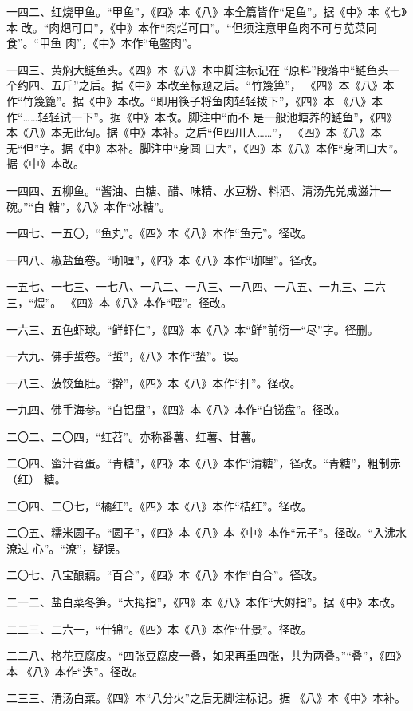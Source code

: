 \begin{list}{}
一四二、红烧甲鱼。“甲鱼”，《四》本《八》本全篇皆作“足鱼”。据《中》本《七》本
改。“肉𤆵可口”，《中》本作“肉烂可口”。“但须注意甲鱼肉不可与苋菜同食”。“甲鱼
肉”，《中》本作“龟鳖肉”。

一四三、黄焖大鲢鱼头。《四》本《八》本中脚注标记{\footnotesize{}}在
“原料”段落中“鲢鱼头一个约四、五斤”之后。据《中》本改至标题之后。“竹篾箅”，
《四》本《八》本作“竹篾篦”。据《中》本改。“即用筷子将鱼肉轻轻拨下”，《四》本
《八》本作“……轻轻试一下”。据《中》本改。脚注{\footnotesize{}}中“而不
是一般池塘养的鲢鱼”，《四》本《八》本无此句。据《中》本补。之后“但四川人……”，
《四》本《八》本无“但”字。据《中》本补。脚注{\footnotesize{}}中“身圆
口大”，《四》本《八》本作“身团口大”。据《中》本改。

一四四、五柳鱼。“酱油、白糖、醋、味精、水豆粉、料酒、清汤先兑成滋汁一碗。”“白
糖”，《八》本作“冰糖”。

一四七、一五〇，“鱼丸”。《四》本《八》本作“鱼元”。径改。

一四八、椒盐鱼卷。“咖喱”，《四》本《八》本作“咖哩”。径改。

一五七、一七三、一七八、一八二、一八三、一八四、一八五、一九三、二六三，“煨”。
《四》本《八》本作“喂”。径改。

一六三、五色虾球。“鲜虾仁”，《四》本《八》本“鲜”前衍一“尽”字。径删。

一六九、佛手蜇卷。“蜇”，《八》本作“蛰”。误。

一八三、菠饺鱼肚。“擀”，《四》本《八》本作“扞”。径改。

一九四、佛手海参。“白铝盘”，《四》本《八》本作“白锑盘”。径改。

二〇二、二〇四，“红苕”。亦称番薯、红薯、甘薯。

二〇四、蜜汁苕蛋。“青糖”，《四》本《八》本作“清糖”，径改。“青糖”，粗制赤（红）
糖。

二〇四、二〇七，“橘红”。《四》本《八》本作“桔红”。径改。

二〇五、糯米圆子。“圆子”，《四》本《八》本《中》本作“元子”。径改。“入沸水潦过
心”。“潦”，疑误。

二〇七、八宝酿藕。“百合”，《四》本《八》本作“白合”。径改。

二一二、盐白菜冬笋。“大拇指”，《四》本《八》本作“大姆指”。据《中》本改。

二二三、二六一，“什锦”。《四》本《八》本作“什景”。径改。

二二八、格花豆腐皮。“四张豆腐皮一叠，如果再重四张，共为两叠。”“叠”，《四》本
《八》本作“迭”。径改。

二三三、清汤白菜。《四》本“八分火”之后无脚注标记{\footnotesize{}}。据
《八》本《中》本补。


\end{list}
